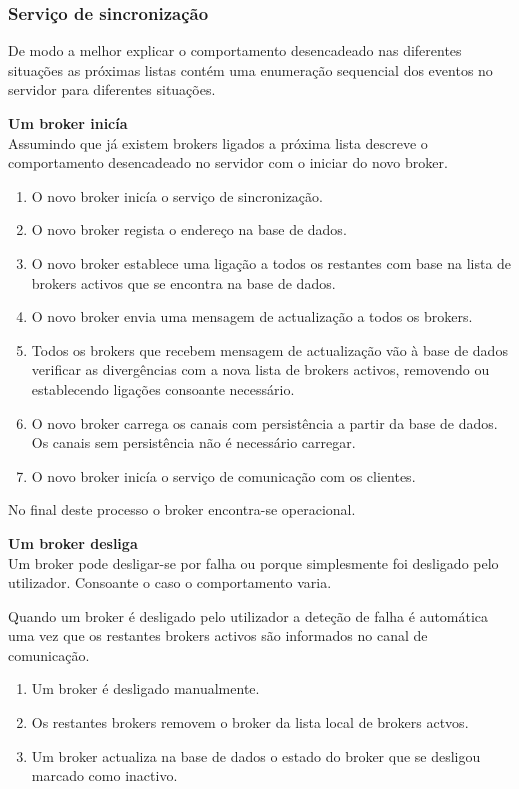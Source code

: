 
\subsubsection{Serviço de sincronização}
De modo a melhor explicar o comportamento desencadeado nas diferentes situações as próximas listas contém uma enumeração sequencial dos eventos no servidor para diferentes situações.

\hl{}

\textbf{Um broker inicía}\\
Assumindo que já existem brokers ligados a próxima lista descreve o comportamento desencadeado no servidor com o iniciar do novo broker.

\begin{enumerate}
\item O novo broker inicía o serviço de sincronização.
\item O novo broker regista o endereço na base de dados.
\item O novo broker establece uma ligação a todos os restantes com base na lista de brokers activos que se encontra na base de dados.
\item O novo broker envia uma mensagem de actualização a todos os brokers.
\item Todos os brokers que recebem mensagem de actualização vão à base de dados verificar as divergências com a nova lista de brokers activos, removendo ou establecendo ligações consoante necessário.
\item O novo broker carrega os canais com persistência a partir da base de dados. Os canais sem persistência não é necessário carregar.
\item O novo broker inicía o serviço de comunicação com os clientes.
\end{enumerate}

No final deste processo o broker encontra-se operacional.

\hl{}

\textbf{Um broker desliga}\\
Um broker pode desligar-se por falha ou porque simplesmente foi desligado pelo utilizador. Consoante o caso o comportamento varia.

Quando um broker é desligado pelo utilizador a deteção de falha é automática uma vez que os restantes brokers activos são informados no canal de comunicação.

\begin{enumerate}
\item Um broker é desligado manualmente.
\item Os restantes brokers removem o broker da lista local de brokers actvos.
\item Um broker actualiza na base de dados o estado do broker que se desligou marcado como inactivo.
\end{enumerate}


